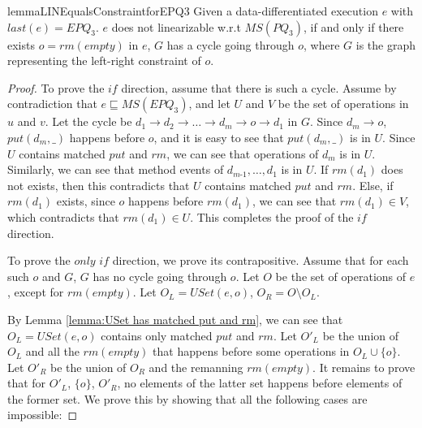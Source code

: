 \begin{restatable}{lemma}{LINEqualsConstraintforEPQ3}
\label{lemma:Lin Equals Constraint for EPQ3}
Given a data-differentiated execution $e$ with $\textit{last}(e) = \textit{EPQ}_3$. $e$ does not linearizable w.r.t $\textit{MS}(\textit{PQ}_3)$, if and only if there exists $o = \textit{rm}(\textit{empty})$ in $e$, $G$ has a cycle going through $o$, where $G$ is the graph representing the left-right constraint of $o$.
\end{restatable}

\begin {proof}

To prove the $\textit{if}$ direction, assume that there is such a cycle. Assume by contradiction that $e \sqsubseteq \textit{MS}(\textit{EPQ}_3)$, and let $U$ and $V$ be the set of operations in $u$ and $v$. Let the cycle be $d_1 \rightarrow d_2 \rightarrow \ldots \rightarrow d_m \rightarrow o \rightarrow d_1$ in $G$. Since $d_m \rightarrow o$, $\textit{put}(d_m,\_)$ happens before $o$, and it is easy to see that $\textit{put}(d_m,\_)$ is in $U$. Since $U$ contains matched $\textit{put}$ and $\textit{rm}$, we can see that operations of $d_m$ is in $U$. Similarly, we can see that method events of $d_{\textit{m-1}},\ldots,d_1$ is in $U$. If $\textit{rm}(d_1)$ does not exists, then this contradicts that $U$ contains matched $\textit{put}$ and $\textit{rm}$. Else, if $\textit{rm}(d_1)$ exists, since $o$ happens before $\textit{rm}(d_1)$, we can see that $\textit{rm}(d_1) \in V$, which contradicts that $\textit{rm}(d_1) \in U$. This completes the proof of the $\textit{if}$ direction.

To prove the $\textit{only if}$ direction, we prove its contrapositive. Assume that for each such $o$ and $G$, $G$ has no cycle going through $o$. Let $O$ be the set of operations of $e$, except for $\textit{rm}(\textit{empty})$. Let $O_L = \textit{USet}(e,o)$, $O_R = O \setminus O_L$.

By Lemma \ref{lemma:USet has matched put and rm}, we can see that $O_L = \textit{USet}(e,o)$ contains only matched $\textit{put}$ and $\textit{rm}$. Let $O'_L$ be the union of $O_L$ and all the $\textit{rm}(\textit{empty})$ that happens before some operations in $O_L \cup \{ o \}$. Let $O'_R$ be the union of $O_R$ and the remanning $\textit{rm}(\textit{empty})$. It remains to prove that for $O'_L$, $\{ o \}$, $O'_R$, no elements of the latter set happens before elements of the former set. We prove this by showing that all the following cases are impossible:


\end{proof}
